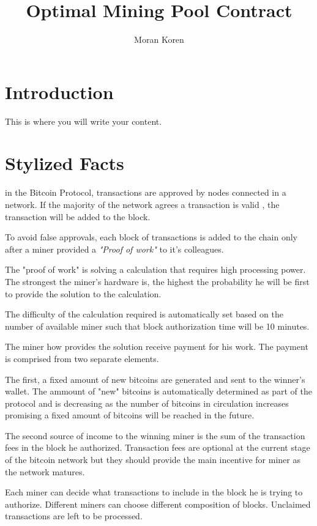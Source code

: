 \documentclass{article}
\title{Optimal Mining Pool Contract}
\author{Moran Koren}
\begin{document}
 
\maketitle{}
 
\section{Introduction}
 
This is where you will write your content.

\section{Stylized Facts}

in the Bitcoin Protocol, transactions are approved by nodes connected in a network. If the majority of the network agrees a transaction is valid , the transaction will be added to the block.

To avoid false approvals, each block of transactions is added to the chain only after a miner provided a \textit{"Proof of work"} to it's colleagues.

The "proof of work" is solving a calculation that requires high processing power. The strongest the miner's hardware is, the highest the probability he will be first to provide the solution to the calculation.

The difficulty of the calculation required is automatically set based on the number of available miner such that block authorization time will be 10 minutes.

The miner how provides the solution receive payment for his work. The payment is comprised from two separate elements. 

The first, a fixed amount of new bitcoins are generated and sent to the winner's wallet. The ammount of "new" bitcoins is automatically determined as part of the protocol and is decreasing as the number of bitcoins in circulation increases promising a fixed amount of bitcoins will be reached in the future.

The second source of income to the winning miner is the sum of the transaction fees in the block he authorized. Transaction fees are optional at the current stage of the bitcoin network but they should provide the main incentive for miner as the network matures.

Each miner can decide what transactions to include in the block he is trying to authorize. Different miners can choose different composition of blocks. Unclaimed transactions are left to be processed.
\end{document}
